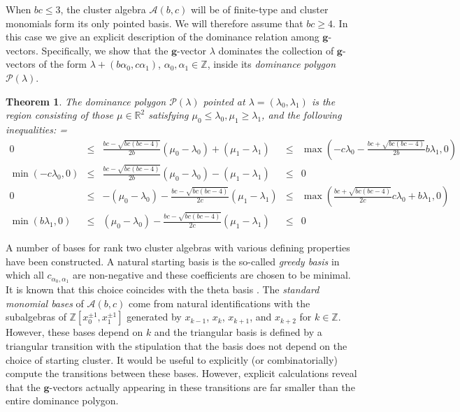 \documentclass{amsart}
\newtheorem{theorem}{Theorem}
\numberwithin{theorem}{section}
\newcommand{\bfg}{\boldsymbol{g}}
\newcommand{\cA}{\mathcal{A}}
\newcommand{\cP}{\mathcal{P}}
\newcommand{\RR}{\mathbb{R}}
\newcommand{\ZZ}{\mathbb{Z}}
\begin{document}
  When $bc\le3$, the cluster algebra $\cA(b,c)$ will be of finite-type and cluster monomials form its only pointed basis.
  We will therefore assume that $bc\ge4$.
  In this case we give an explicit description of the dominance relation among $\bfg$-vectors.
  Specifically, we show that the $\bfg$-vector $\lambda$ dominates the collection of $\bfg$-vectors of the form $\lambda+(b \alpha_0 ,c \alpha_1)$, $\alpha_0,\alpha_1\in\ZZ$, inside its \emph{dominance polygon} $\cP(\lambda)$.
  \begin{theorem}
    \label{th:dominance inequalities}
    The dominance polygon $\cP(\lambda)$ pointed at $\lambda=(\lambda_0,\lambda_1)$ is the region consisting of those $\mu\in\RR^2$ satisfying $\mu_0 \leq \lambda_0, \mu_1 \geq\lambda_1$, and the following inequalities:
    {
      \everymath={\displaystyle}
      \def\arraystretch{2.8}
      \[
        \begin{array}{rcccl}
          0 & \leq & \frac{b c-\sqrt{b c (b c-4)}}{2 b}(\mu_0-\lambda_0)+(\mu_1-\lambda_1) & \leq & \max\left(-c\lambda_0-\frac{b c+\sqrt{b c (b c-4)}}{2b}b\lambda_1,0\right)
          \\
          \min\left(-c\lambda_0,0\right) & \leq & \frac{b c-\sqrt{b c (b c-4)}}{2 b}(\mu_0-\lambda_0)-(\mu_1-\lambda_1) & \leq & 0
          \\
          0 & \leq &  -(\mu_0-\lambda_0)-\frac{b c-\sqrt{b c (b c-4)}}{2 c}(\mu_1-\lambda_1) & \leq & \max\left(\frac{b c+\sqrt{b c (b c-4)}}{2c}c\lambda_0+b\lambda_1,0\right)
          \\
          \min\left(b \lambda_1,0\right) & \leq & (\mu_0-\lambda_0) - \frac{b c-\sqrt{b c (b c-4)}}{2 c} (\mu_1-\lambda_1) & \leq & 0
        \end{array}
      \]
    }
  \end{theorem}

  A number of bases for rank two cluster algebras with various defining properties have been constructed.
  A natural starting basis is the so-called \emph{greedy basis} in which all $c_{\alpha_0,\alpha_1}$ are non-negative and these coefficients are chosen to be minimal.
  It is known that this choice coincides with the theta basis \cite{GHKK, CGMMRSW}.
  The \emph{standard monomial bases} of $\cA(b,c)$ come from natural identifications with the subalgebras of $\ZZ[x_0^{\pm1},x_1^{\pm1}]$ generated by $x_{k-1}$, $x_k$, $x_{k+1}$, and $x_{k+2}$ for $k\in\ZZ$.
  However, these bases depend on $k$ and the triangular basis is defined by a triangular transition with the stipulation that the basis does not depend on the choice of starting cluster.
  It would be useful to explicitly (or combinatorially) compute the transitions between these bases.
  However, explicit calculations reveal that the $\bfg$-vectors actually appearing in these transitions are far smaller than the entire dominance polygon.
\end{document}
